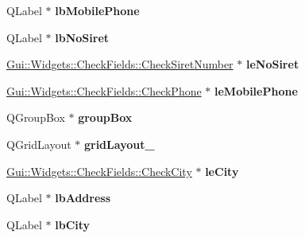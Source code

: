 \begin{DoxyCompactItemize}
\item 
\hypertarget{classUi__UserDataDialog_a88b223582a3024fbf044f3b96450bdf4}{Q\-Label $\ast$ {\bfseries lb\-Mobile\-Phone}}\label{classUi__UserDataDialog_a88b223582a3024fbf044f3b96450bdf4}

\item 
\hypertarget{classUi__UserDataDialog_a8ba07e32c8b6370036c5adb9b93abd9d}{Q\-Label $\ast$ {\bfseries lb\-No\-Siret}}\label{classUi__UserDataDialog_a8ba07e32c8b6370036c5adb9b93abd9d}

\item 
\hypertarget{classUi__UserDataDialog_a00d271fb0fd2db25b13c4348318a2860}{\hyperlink{classGui_1_1Widgets_1_1CheckFields_1_1CheckSiretNumber}{Gui\-::\-Widgets\-::\-Check\-Fields\-::\-Check\-Siret\-Number} $\ast$ {\bfseries le\-No\-Siret}}\label{classUi__UserDataDialog_a00d271fb0fd2db25b13c4348318a2860}

\item 
\hypertarget{classUi__UserDataDialog_ad7068b19fdd2658515dde363d20fe345}{\hyperlink{classGui_1_1Widgets_1_1CheckFields_1_1CheckPhone}{Gui\-::\-Widgets\-::\-Check\-Fields\-::\-Check\-Phone} $\ast$ {\bfseries le\-Mobile\-Phone}}\label{classUi__UserDataDialog_ad7068b19fdd2658515dde363d20fe345}

\item 
\hypertarget{classUi__UserDataDialog_ab9e6314ff05a058fc3e63c904cefe2a5}{Q\-Group\-Box $\ast$ {\bfseries group\-Box}}\label{classUi__UserDataDialog_ab9e6314ff05a058fc3e63c904cefe2a5}

\item 
\hypertarget{classUi__UserDataDialog_ab882779b01f94e0fb862086db486d129}{Q\-Grid\-Layout $\ast$ {\bfseries grid\-Layout\-\_}}\label{classUi__UserDataDialog_ab882779b01f94e0fb862086db486d129}

\item 
\hypertarget{classUi__UserDataDialog_addebb20cfa7b3ed48b708cf0e15e8284}{\hyperlink{classGui_1_1Widgets_1_1CheckFields_1_1CheckCity}{Gui\-::\-Widgets\-::\-Check\-Fields\-::\-Check\-City} $\ast$ {\bfseries le\-City}}\label{classUi__UserDataDialog_addebb20cfa7b3ed48b708cf0e15e8284}

\item 
\hypertarget{classUi__UserDataDialog_af86525c3f46a544c34d08877b4b1c4e7}{Q\-Label $\ast$ {\bfseries lb\-Address}}\label{classUi__UserDataDialog_af86525c3f46a544c34d08877b4b1c4e7}

\item 
\hypertarget{classUi__UserDataDialog_acabdcd76e9e82b950025537448a7670d}{Q\-Label $\ast$ {\bfseries lb\-City}}\label{classUi__UserDataDialog_acabdcd76e9e82b950025537448a7670d}


\end{DoxyCompactItemize}
